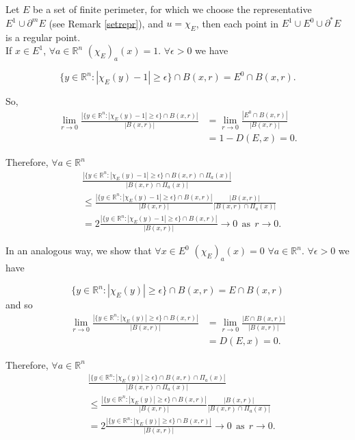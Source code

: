 \begin{example} \label{regpointchar} Let $E$ be a set of finite perimeter, for which we choose the representative $E^{1} \cup \partial^{m} E$ (see Remark \ref{setrepr}), and $u = \chi_{E}$, then each point in $E^{1} \cup E^{0} \cup \partial^{*}E$ is a regular point. 
\\
If $x \in E^{1}$, $\forall a \in \mathbb{R}^{n}$ $(\chi_{E})_{a}(x) = 1$.
$\forall \epsilon > 0$ we have

\[ \{y \in \mathbb{R}^{n} : |\chi_{E}(y) - 1| \ge \epsilon \} \cap B(x,r) = E^{0} \cap B(x, r) . \]

So, 
\begin{align*} \lim_{r \to 0} \frac{|\{y \in \mathbb{R}^{n} : |\chi_{E}(y) - 1| \ge \epsilon \} \cap B(x,r)|}{|B(x, r)|} &= \lim_{r \to 0} \frac{|E^{0} \cap B(x, r)|}{|B(x, r)|} \\
&= 1 - D(E, x)  = 0. 
\end{align*}

Therefore, $\forall a \in \mathbb{R}^{n}$
\begin{align*} & \frac{ |\{y \in \mathbb{R}^{n} : |\chi_{E}(y) - 1| \ge \epsilon \} \cap B(x, r) \cap \Pi_{a}(x)|}{|B(x, r) \cap \Pi_{a}(x)|} \\
& \le \frac{|\{y \in \mathbb{R}^{n} : |\chi_{E}(y) - 1| \ge \epsilon \} \cap B(x, r)|}{|B(x, r)|} \frac{|B(x, r)|}{|B(x, r) \cap \Pi_{a}(x)|} \\
& = 2 \frac{|\{y \in \mathbb{R}^{n} : |\chi_{E}(y) - 1| \ge \epsilon \} \cap B(x, r)|}{|B(x, r)|} \to 0 \ \ \text{as} \ \ r \to 0.
\end{align*}

In an analogous way, we show that $\forall x \in E^{0}$ $(\chi_{E})_{a}(x) = 0$ $\forall a \in \mathbb{R}^{n}$. $\forall \epsilon > 0$ we have

\[ \{y \in \mathbb{R}^{n} : |\chi_{E}(y)| \ge \epsilon \} \cap B(x,r) = E \cap B(x, r)  \]
and so
\begin{align*} \lim_{r \to 0} \frac{|\{y \in \mathbb{R}^{n} : |\chi_{E}(y)| \ge \epsilon \} \cap B(x,r)|}{|B(x, r)|} &= \lim_{r \to 0} \frac{|E \cap B(x, r)|}{|B(x, r)|} \\
&= D(E, x)  = 0. 
\end{align*}

Therefore, $\forall a \in \mathbb{R}^{n}$
\begin{align*} & \frac{ |\{y \in \mathbb{R}^{n} : |\chi_{E}(y)| \ge \epsilon \}\cap B(x, r) \cap \Pi_{a}(x)|}{|B(x, r) \cap \Pi_{a}(x)|} \\
& \le \frac{|\{y \in \mathbb{R}^{n} : |\chi_{E}(y)| \ge \epsilon \} \cap B(x, r)|}{|B(x, r)|} \frac{|B(x, r)|}{|B(x, r) \cap \Pi_{a}(x)|} \\
& = 2 \frac{|\{y \in \mathbb{R}^{n} : |\chi_{E}(y)| \ge \epsilon \} \cap B(x, r)|}{|B(x, r)|} \to 0 \ \ \text{as} \ \ r \to 0.
\end{align*}


\end{example}
